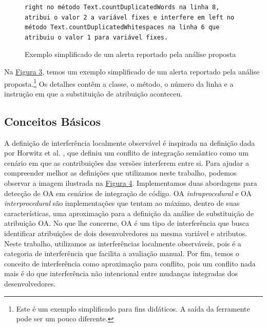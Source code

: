 \begin{figure}[!h]
    \begin{lstlisting}[escapechar=!]
right no método Text.countDuplicatedWords na linha 8, atribui o valor 2 a variável fixes e interfere em left no método Text.countDuplicatedWhitespaces na linha 6 que atribuiu o valor 1 para variável fixes.
    \end{lstlisting}
    \caption{Exemplo simplificado de um alerta reportado pela análise proposta}
    \label{fig:report-caso-motivador}
\end{figure}

Na \hyperref[fig:report-caso-motivador]{Figura 3}, temos um exemplo simplificado de um alerta reportado pela análise proposta.\footnote{Este é um exemplo simplificado para fins didáticos. A saída da ferramente pode ser um pouco diferente.} Os detalhes contêm a classe, o método, o número da linha e a instrução em que a substituição de atribuição aconteceu.

\subsection{Conceitos Básicos}

A definição de interferência localmente observável é inspirada na definição dada por Horwitz et al. \cite{Horwitz1989IntegratingNV}, que definiu um conflito de integração semântico como um cenário em que as contribuições das versões interferem entre si. Para ajudar a compreender melhor as definições que utilizamos neste trabalho, podemos observar a imagem ilustrada na  \hyperref[fig:analysis]{Figura 4}. Implementamos duas abordagens para detecção de OA em cenários de integração de código. OA \emph{intraprocedural} e OA \emph{interprocedural} são implementações que tentam ao máximo, dentro de suas características, uma aproximação para a definição da análise de substituição de atribuição OA. No que lhe concerne, OA é um tipo de interferência que busca identificar atribuições de dois desenvolvedores na mesma variável e atributos. Neste trabalho, utilizamos as interferências localmente observáveis, pois é a categoria de interferência que facilita a avaliação manual. Por fim, temos o conceito de interferência como aproximação para conflito, pois um conflito nada mais é do que interferência não intencional entre mudanças integradas dos desenvolvedores.

